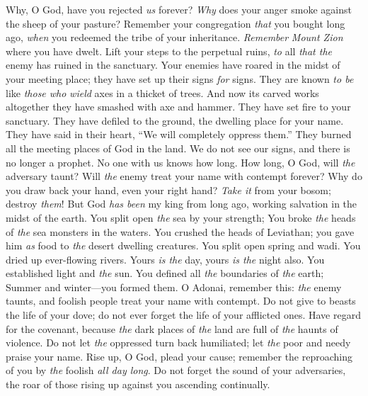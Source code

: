 \begin{biblechapter} %
 Why, O God, have you rejected \textit{us} forever? 
\textit{Why} does your anger smoke 
against the sheep of your pasture?
\verse Remember your congregation \textit{that} you bought long ago, 
\textit{when} you redeemed the tribe of your inheritance. 
\textit{Remember} \textit{Mount Zion} where you have dwelt.
\verse Lift your steps to the perpetual ruins, 
\textit{to} all \textit{that the} enemy has ruined in the sanctuary.
\verse Your enemies have roared in the midst of your meeting place; 
they have set up their signs \textit{for} signs.
\verse They are known \textit{to be} like \textit{those who} \textit{wield} 
axes in a thicket of trees.
\verse And now its carved works altogether 
they have smashed with axe and hammer.
\verse They have set fire to your sanctuary. 
They have defiled to the ground, 
the dwelling place for your name.
\verse They have said in their heart, 
“We will completely oppress them.” 
They burned all the meeting places of God in the land.
\verse We do not see our signs, 
and there is no longer a prophet. 
No one with us knows how long.
\verse How long, O God, will \textit{the} adversary taunt? 
Will \textit{the} enemy treat your name with contempt forever?
\verse Why do you draw back your hand, even your right hand? 
\textit{Take it} from your bosom; destroy \textit{them}!
\verse But God \textit{has been} my king from long ago, 
working salvation in the midst of the earth.
\verse You split open \textit{the} sea by your strength; 
You broke \textit{the} heads of \textit{the} sea monsters in the waters.
\verse You crushed the heads of Leviathan; 
you gave him \textit{as} food to \textit{the} desert dwelling creatures.
\verse You split open spring and wadi. 
You dried up ever-flowing rivers.
\verse Yours \textit{is the} day, yours \textit{is the} night also. 
You established light and \textit{the} sun.
\verse You defined all \textit{the} boundaries of \textit{the} earth; 
Summer and winter—you formed them.
\verse O Adonai, remember this: \textit{the} enemy taunts, 
and foolish people treat your name with contempt.
\verse Do not give to beasts the life of your dove; 
do not ever forget the life of your afflicted ones.
\verse Have regard for the covenant, 
because \textit{the} dark places of \textit{the} land are full of 
\textit{the} haunts of violence.
\verse Do not let \textit{the} oppressed turn back humiliated; 
let \textit{the} poor and needy praise your name.
\verse Rise up, O God, plead your cause; 
remember the reproaching of you by \textit{the} foolish \textit{all day long}.
\verse Do not forget the sound of your adversaries, 
the roar of those rising up against you ascending continually.
\end{biblechapter}

